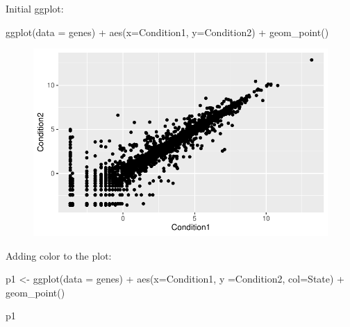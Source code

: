 \documentclass[
  letterpaper,
  DIV=11,
  numbers=noendperiod]{scrartcl}
\newenvironment{Shaded}{\begin{snugshade}}{\end{snugshade}}
\newcommand{\AttributeTok}[1]{\textcolor[rgb]{0.40,0.45,0.13}{#1}}
\newcommand{\FunctionTok}[1]{\textcolor[rgb]{0.28,0.35,0.67}{#1}}
\newcommand{\NormalTok}[1]{\textcolor[rgb]{0.00,0.23,0.31}{#1}}
\newcommand{\OtherTok}[1]{\textcolor[rgb]{0.00,0.23,0.31}{#1}}
\newcommand{\SpecialCharTok}[1]{\textcolor[rgb]{0.37,0.37,0.37}{#1}}
\begin{document}
Initial ggplot:

\begin{Shaded}
\begin{Highlighting}[]
\FunctionTok{ggplot}\NormalTok{(}\AttributeTok{data =}\NormalTok{ genes) }\SpecialCharTok{+} \FunctionTok{aes}\NormalTok{(}\AttributeTok{x=}\NormalTok{Condition1, }\AttributeTok{y=}\NormalTok{Condition2) }\SpecialCharTok{+} \FunctionTok{geom\_point}\NormalTok{()}
\end{Highlighting}
\end{Shaded}

\begin{figure}[H]

{\centering \includegraphics{class05_files/figure-pdf/unnamed-chunk-10-1.pdf}

}

\end{figure}

Adding color to the plot:

\begin{Shaded}
\begin{Highlighting}[]
\NormalTok{p1 }\OtherTok{\textless{}{-}} \FunctionTok{ggplot}\NormalTok{(}\AttributeTok{data =}\NormalTok{ genes) }\SpecialCharTok{+} \FunctionTok{aes}\NormalTok{(}\AttributeTok{x=}\NormalTok{Condition1, }\AttributeTok{y  =}\NormalTok{Condition2, }\AttributeTok{col=}\NormalTok{State) }\SpecialCharTok{+} \FunctionTok{geom\_point}\NormalTok{()}

\NormalTok{p1}
\end{Highlighting}
\end{Shaded}
\end{document}
